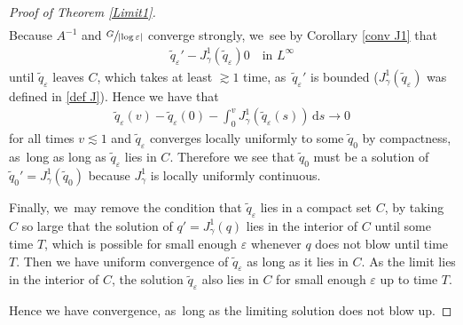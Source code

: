\documentclass[JEP,XML,SOM,Unicode,published]{cedram}
\let\epsilon\varepsilon
\theoremstyle{definition}
\newcommand\dd{\,\mathrm{d}}
\newcommand\ds{\dd s}
\let\eps\epsilon
\begin{document}
\begin{proof}[Proof of Theorem \ref{Limit1}]
\begin{align*}
\end{align*}
Because $A^{-1}$ and $\sfrac{G}{|{\log\eps}|}$ converge strongly, we~see by Corollary \ref{conv J1} that
\begin{align*}
\tilde{q}_\eps'- J_\gamma^1(\tilde{q}_\eps)0 \quad\text{in $L^\infty$}
\end{align*}
until $\tilde{q}_\eps$ leaves $C$, which takes at least $\gtrsim 1$ time, as~$\tilde{q}_\eps'$ is bounded ($J_\gamma^1(\tilde{q}_\eps)$ was defined in \ref{def J}).
Hence we have that
\begin{align*}
\tilde{q}_\eps(v)-\tilde{q}_\eps(0)-\int_0^v J_\gamma^1(\tilde{q}_\eps(s))\ds\to 0
\end{align*}
for all times $v\lesssim 1$ and $\tilde{q}_\eps$ converges locally uniformly to some $\tilde{q}_0$ by compactness, as~long as long as $\tilde{q}_\eps$ lies in $C$. Therefore we see that $\tilde{q}_0$ must be a solution of $\tilde{q}_0'=J_\gamma^1(\tilde{q}_0)$ because $J_\gamma^1$ is locally uniformly continuous.

Finally, we~may remove the condition that $\tilde{q}_\eps$ lies in a compact set $C$, by taking~$C$ so large that the solution of $q'=J_\gamma^1(q)$ lies in the interior of $C$ until some time $T$, which is possible for small enough $\eps$ whenever $q$ does not blow until time $T$. Then we have uniform convergence of $\tilde{q}_\eps$ as long as it lies in $C$. As the limit lies in the interior of $C$, the solution $\tilde{q}_\eps$ also lies in $C$ for small enough $\eps$ up to time $T$.

Hence we have convergence, as~long as the limiting solution does not blow up.
\end{proof}
\end{document}
